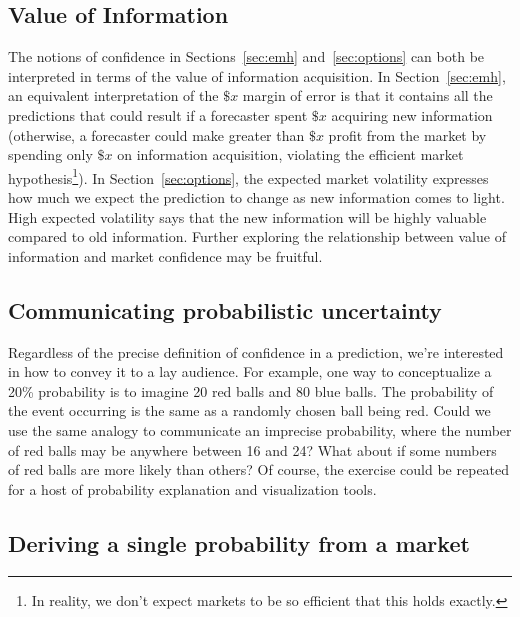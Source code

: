 \documentclass[sigconf,anonymous]{aamas}   %
\newcommand{\rupert}[1]{\ifnum\Chatty=1 \textcolor{red}   {Rupert: [#1]} \fi}
\newcommand{\dreev} [1]{\ifnum\Chatty=1 \textcolor{purple}{dreev:  [#1]} \fi}
\begin{document}
\subsection{Value of Information}

The notions of confidence in Sections~\ref{sec:emh} and~\ref{sec:options} can both be interpreted in terms of the value of information acquisition. In Section~\ref{sec:emh}, an equivalent interpretation of the $\$x$ margin of error is that it contains all the predictions that could result if a forecaster spent $\$x$ acquiring new information (otherwise, a forecaster could make greater than $\$x$ profit from the market by spending only $\$x$ on information acquisition, violating the efficient market hypothesis\footnote{In reality, we don't expect markets to be so efficient that this holds exactly.}). In Section~\ref{sec:options}, the expected market volatility expresses how much we expect the prediction to change as new information comes to light. High expected volatility says that the new information will be highly valuable compared to old information.
Further exploring the relationship between value of information and market confidence may be fruitful.


\subsection{Communicating probabilistic uncertainty}

Regardless of the precise definition of confidence in a prediction, we're interested in how to convey it to a lay audience.
For example, one way to conceptualize a 20\% probability is to imagine 20 red balls and 80 blue balls. 
The probability of the event occurring is the same as a randomly chosen ball being red. 
Could we use the same analogy to communicate an imprecise probability, where the number of red balls 
may be anywhere between 16 and 24? 
What about if some numbers of red balls are more likely than others? 
Of course, the exercise could be repeated for a host of probability explanation and visualization tools.

\subsection{Deriving a single probability from a market}
\end{document}
